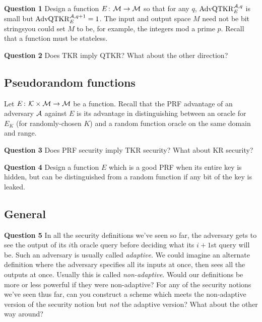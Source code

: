 \documentclass{article}
\newcommand{\KR}{\mathrm{KR}}
\newcommand{\TKR}{\mathrm{TKR}}
\newcommand{\LQKR}{\mathrm{QTKR}}
\newcommand{\AdvLQKR}[2]{\mathrm{AdvQTKR}_{#1}^{#2}}
\newcommand{\keyspace}{\calK}
\begin{document}
\noindent\textbf{Question 1} Design a function 
$E{\kern .05em}\colon{\kern .05em} \mathcal{M}\rightarrow \mathcal{M}$ so that for any $q$, $\AdvLQKR{E}{\advA,q}$ is small but $\AdvLQKR{E}{\advA,q+1}=1$. The input and output space $M$ need not be bit strings\textemdash you could set $M$ to be, for example, the integers mod a prime $p$. Recall that a function must be stateless.

\noindent\textbf{Question 2} Does $\TKR$ imply $\LQKR$? What about the other direction?

\subsection*{Pseudorandom functions}

Let $E\Colon\keyspace\times\msgspace\rightarrow\msgspace$ be a function. Recall that the PRF advantage of an adversary ${\mathcal A}$ against $E$ is its advantage in distinguishing between an oracle for $E_K$ (for randomly-chosen $K$) and a random function oracle on the same domain and range.

\noindent\textbf{Question 3} Does PRF security imply $\TKR$ security? What about $\KR$ security?


\noindent\textbf{Question 4} Design a function $E$ which is a good PRF when its entire key is hidden, but can be distinguished from a random function if any bit of the key is leaked.


\subsection*{General}

\noindent\textbf{Question 5} In all the security definitions we've seen so far, the adversary
gets to see the output of its $i$th oracle query before deciding what its $i+1$st query will be.
Such an adversary is usually called \emph{adaptive}. We could imagine an alternate definition where
the adversary specifies all its inputs at once, then sees all the outputs at once. Usually this is
called \emph{non-adaptive}. Would our definitions be more or less powerful if they were non-adaptive?
For any of the security notions we've seen thus far, can you construct a scheme which
meets the non-adaptive version of the security notion but \emph{not} the adaptive version?
What about the other way around?
\end{document}
